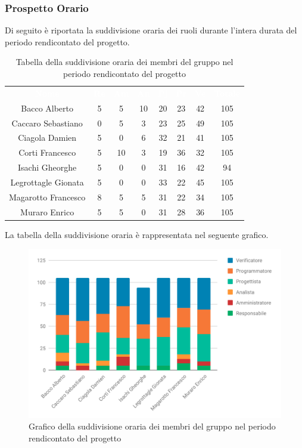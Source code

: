 \subsubsection{Prospetto Orario}
Di seguito è riportata la suddivisione oraria dei ruoli durante l'intera durata del periodo rendicontato del progetto.


\begin{table}[H]	
	\begin{center}
	    \begin{tabular}{cccccccc}
			\rowcolor{greySWEight}
			\textcolor{white}{\textbf{Nome}} & \textcolor{white}{\textbf{Re}} & \textcolor{white}{\textbf{Am}} & \textcolor{white}{\textbf{An}} & \textcolor{white}{\textbf{Pj}} & \textcolor{white}{\textbf{Pr}} & \textcolor{white}{\textbf{Ve}} & \textcolor{white}{\textbf{Totale}}
			\\			
				Bacco Alberto & 5 & 5 & 10 & 20 & 23 & 42 & 105 \\
				Caccaro Sebastiano & 0 & 5 & 3 & 23 & 25 & 49 & 105 \\
				Ciagola Damien & 5 & 0 & 6 & 32 & 21 & 41 & 105 \\
				Corti Francesco & 5 & 10 & 3 & 19 & 36 & 32 & 105 \\
				Isachi Gheorghe & 5 & 0 & 0 & 31 & 16 & 42 & 94 \\
				Legrottagle Gionata & 5 & 0 & 0 & 33 & 22 & 45 & 105 \\
				Magarotto Francesco & 8 & 5 & 5 & 31 & 22 & 34 & 105 \\
				Muraro Enrico & 5 & 5 & 0 & 31 & 28 & 36 & 105 \\
			\end{tabular}
	    \caption{Tabella della suddivisione oraria dei membri del gruppo nel periodo rendicontato del progetto} \label{tab:tabellaPersoneTotale} 
	\end{center}
\end{table}

La tabella della suddivisione oraria è rappresentata nel seguente grafico.
\begin{figure}[H]
	\includegraphics[width=1\linewidth]{Preventivo/grafici/TR1_1.pdf}
	\caption{Grafico della suddivisione oraria dei membri del gruppo nel periodo rendicontato del progetto}
\end{figure}

